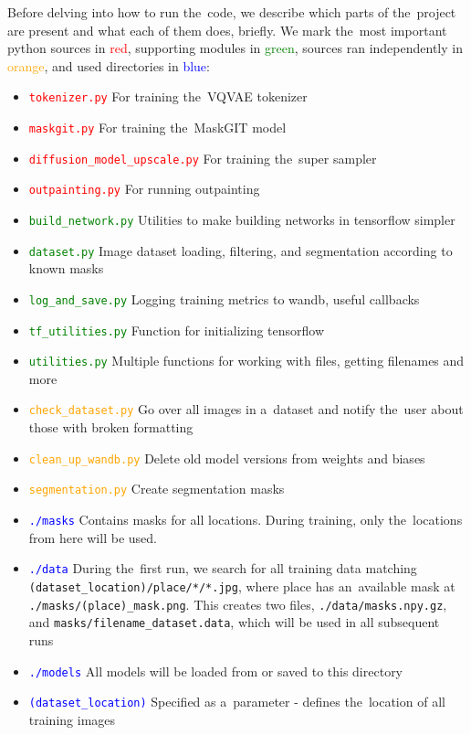 Before delving into how to run the~code, we describe which parts of the~project are present and what each of them does, briefly. We mark the~most important python sources in \textcolor{red}{red}, supporting modules in \textcolor{green}{green}, sources ran independently in \textcolor{orange}{orange}, and used directories in \textcolor{blue}{blue}:
\begin{itemize}
    \item \textcolor{red}{\texttt{tokenizer.py}} For training the~VQVAE tokenizer
    \item \textcolor{red}{\texttt{maskgit.py}} For training the~MaskGIT model
    \item \textcolor{red}{\texttt{diffusion\_model\_upscale.py}} For training the~super sampler
    \item \textcolor{red}{\texttt{outpainting.py}} For running outpainting

    \item \textcolor{green}{\texttt{build\_network.py}} Utilities to make building networks in tensorflow simpler
    \item \textcolor{green}{\texttt{dataset.py}} Image dataset loading, filtering, and segmentation according to known masks
    \item \textcolor{green}{\texttt{log\_and\_save.py}} Logging training metrics to wandb, useful callbacks
    \item \textcolor{green}{\texttt{tf\_utilities.py}} Function for initializing tensorflow
    \item \textcolor{green}{\texttt{utilities.py}} Multiple functions for working with files, getting filenames and more

    \item \textcolor{orange}{\texttt{check\_dataset.py}} Go over all images in a~dataset and notify the~user about those with broken formatting
    \item \textcolor{orange}{\texttt{clean\_up\_wandb.py}} Delete old model versions from weights and biases
    \item \textcolor{orange}{\texttt{segmentation.py}} Create segmentation masks

    \item \textcolor{blue}{\texttt{./masks}} Contains masks for all locations. During training, only the~locations from here will be used.
    \item \textcolor{blue}{\texttt{./data}} During the~first run, we search for all training data matching \texttt{(dataset\_location)/place/*/*.jpg}, where place has an~available mask at \texttt{./masks/(place)\_mask.png}. This creates two files, \texttt{./data/masks.npy.gz}, and \texttt{masks/filename\_dataset.data}, which will be used in all subsequent runs
    \item \textcolor{blue}{\texttt{./models}} All models will be loaded from or saved to this directory
    \item \textcolor{blue}{\texttt{(dataset\_location)}} Specified as a~parameter - defines the~location of all training images
\end{itemize}



